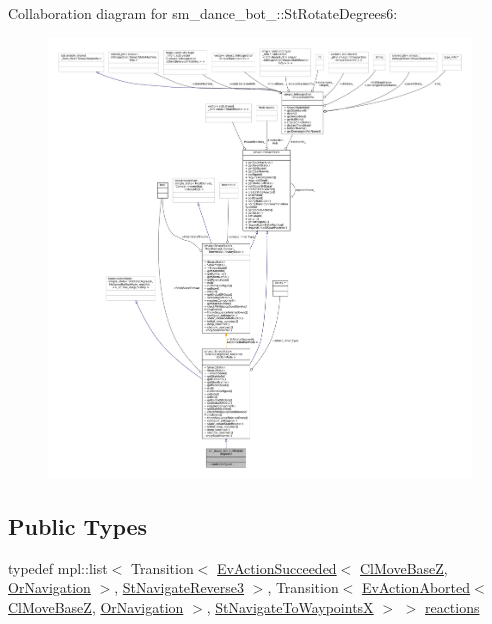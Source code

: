 Collaboration diagram for sm\+\_\+dance\+\_\+bot\+\_\+:\+:St\+Rotate\+Degrees6\+:
\nopagebreak
\begin{figure}[H]
\begin{center}
\leavevmode
\includegraphics[width=350pt]{structsm__dance__bot__2_1_1StRotateDegrees6__coll__graph}
\end{center}
\end{figure}
\subsection*{Public Types}
\begin{DoxyCompactItemize}
\item 
typedef mpl\+::list$<$ Transition$<$ \hyperlink{structsmacc_1_1default__events_1_1EvActionSucceeded}{Ev\+Action\+Succeeded}$<$ \hyperlink{classcl__move__base__z_1_1ClMoveBaseZ}{Cl\+Move\+BaseZ}, \hyperlink{classsm__dance__bot__2_1_1OrNavigation}{Or\+Navigation} $>$, \hyperlink{structsm__dance__bot__2_1_1StNavigateReverse3}{St\+Navigate\+Reverse3} $>$, Transition$<$ \hyperlink{structsmacc_1_1default__events_1_1EvActionAborted}{Ev\+Action\+Aborted}$<$ \hyperlink{classcl__move__base__z_1_1ClMoveBaseZ}{Cl\+Move\+BaseZ}, \hyperlink{classsm__dance__bot__2_1_1OrNavigation}{Or\+Navigation} $>$, \hyperlink{structsm__dance__bot__2_1_1StNavigateToWaypointsX}{St\+Navigate\+To\+WaypointsX} $>$ $>$ \hyperlink{structsm__dance__bot__2_1_1StRotateDegrees6_a86960851edf5d17292994c07a7a4f015}{reactions}
\end{DoxyCompactItemize}
